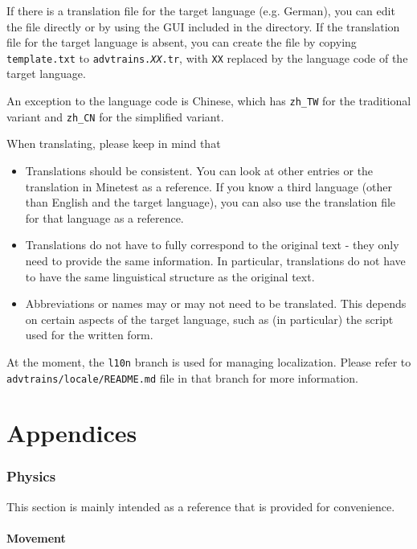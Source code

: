 \documentclass[notitlepage]{article}
\begin{document}
If there is a translation file for the target language (e.g. German), you can edit the file directly or by using the GUI included in the directory. If the translation file for the target language is absent, you can create the file by copying \texttt{template.txt} to \texttt{advtrains.\textit{XX}.tr}, with \texttt{XX} replaced by the language code of the target language.

An exception to the language code is Chinese, which has \texttt{zh\_TW} for the traditional variant and \texttt{zh\_CN} for the simplified variant.

When translating, please keep in mind that
\begin{itemize}
\item Translations should be consistent. You can look at other entries or the translation in Minetest as a reference. If you know a third language (other than English and the target language), you can also use the translation file for that language as a reference.
\item Translations do not have to fully correspond to the original text - they only need to provide the same information. In particular, translations do not have to have the same linguistical structure as the original text.
\item Abbreviations or names may or may not need to be translated. This depends on certain aspects of the target language, such as (in particular) the script used for the written form.
\end{itemize}

At the moment, the \texttt{l10n} branch is used for managing localization. Please refer to \texttt{advtrains/locale/README.md} file in that branch for more information.

\appendix
\newpage
\part*{Appendices}

\section{Physics}\label{s:physics}
This section is mainly intended as a reference that is provided for convenience.

\subsection{Movement}
\end{document}
